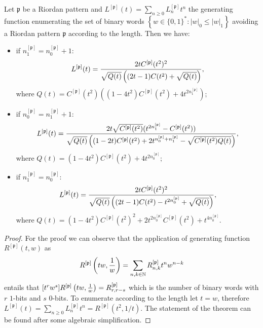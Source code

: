 \begin{theorem}
\label{teo3}
Let $\mathfrak{p}$ be  a Riordan pattern and $L^{[\mathfrak{p}]}(t)=\sum_{n\geq
0}L_n^{[\mathfrak{p}]}t^n$ the generating function enumerating the set of binary words $\left\lbrace w\in
\lbrace 0,1 \rbrace^{*}: |w|_0\leq |w|_1\right\rbrace$ avoiding  a Riordan
pattern $\mathfrak{p}$ according to the length. Then we
have:
\begin{itemize}

\item if $n_1^{[\mathfrak{p}]}=n_0^{[\mathfrak{p}]}+1:$
$$L^{[\mathfrak{p}]}(t)= {2tC^{[\mathfrak{p}]}(t^2)^2 \over \sqrt{Q(t)}\left((2t-1)C(t^2)+ \sqrt{ Q(t) } \right)}, $$
where $Q(t)=C^{[\mathfrak{p}]}(t^2)\left( (1-4t^2)C^{[\mathfrak{p}]}(t^2)+4t^{2n_1^{[\mathfrak{p}]}}\right);$

\item if $n_0^{[\mathfrak{p}]}=n_1^{[\mathfrak{p}]}+1:$
$$L^{[\mathfrak{p}]}(t)={2t\sqrt{C^{[\mathfrak{p}]}(t^2)}(t^{2n_1^{[\mathfrak{p}]}}-C^{[\mathfrak{p}]}(t^2))
\over \sqrt{ Q(t) }\left((1-2t)C^{[\mathfrak{p}]}(t^2)+2t^{n_0^{[\mathfrak{p}]} +n_1^{[\mathfrak{p}]}}
- \sqrt{C^{[\mathfrak{p}]}(t^2) Q(t) } \right)}, $$
where $Q(t)=(1-4t^2)C^{[\mathfrak{p}]}(t^2)+4t^{2n_0^{[\mathfrak{p}]}};$

\item if $n_1^{[\mathfrak{p}]}=n_0^{[\mathfrak{p}]}:$ $$L^{[\mathfrak{p}]}(t)=
{2tC^{[\mathfrak{p}]}(t^2)^2 \over \sqrt{ Q(t)
}\left((2t-1)C(t^2)-t^{2n_0^{[\mathfrak{p}]}} + \sqrt{ Q(t) } \right)}, $$
where
$Q(t)=(1-4t^2)C^{[\mathfrak{p}]}(t^2)^2+2t^{2n_0^{[\mathfrak{p}]}}C^{[\mathfrak{p}]}(t^2)+t^{4n_0^{[\mathfrak{p}]}}.$

\end{itemize}
\end{theorem}
\begin{proof}
For the proof we can observe that the application of generating function $R^{[\mathfrak{p}]}(t, w)$ as
\begin{displaymath}
 R^{[\mathfrak{p}]}\left(tw,{1 \over w}\right)=\sum_{n,k\in\mathbb{N}} R_{n, k}^{[\mathfrak{p}]}t^n w^{n-k}
\end{displaymath}
entails that $[t^{r}w^{s}]R^{[\mathfrak{p}]}\left(tw,{1 \over w}\right)=R_{r,
r-s}^{[\mathfrak{p}]}$ which is the number of binary words with $r$ $1$-bits
and $s$ $0$-bits.  To enumerate according to the length let $t=w$, therefore
$L^{[\mathfrak{p}]}(t)=\sum_{n\geq
0}L_n^{[\mathfrak{p}]}t^n=R^{[\mathfrak{p}]}(t^2,1/t)$. The statement of the
theorem can be found after some algebraic simplification.
\end{proof}

